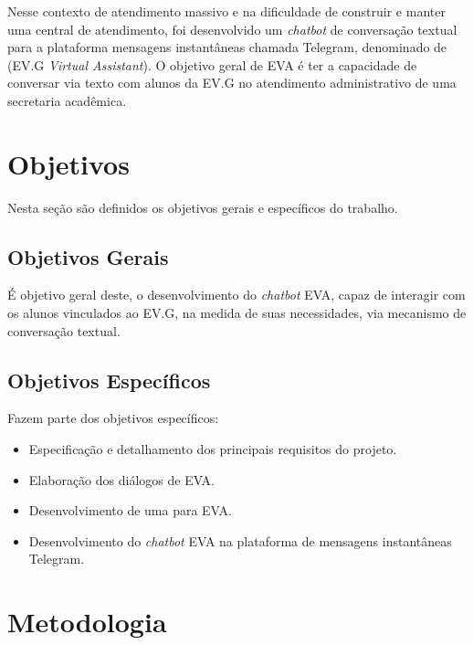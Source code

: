 Nesse contexto de atendimento massivo e na dificuldade de construir e manter uma central de atendimento, foi desenvolvido um \textit{chatbot} de conversação textual para a plataforma mensagens instantâneas chamada  Telegram, denominado de  (EV.G \textit{Virtual Assistant}).
O objetivo geral de EVA é ter a capacidade de conversar via texto com alunos da EV.G no atendimento administrativo de uma secretaria acadêmica.


\section{Objetivos}\label{cap:01:sec:01:objetivos}

Nesta seção são definidos os objetivos gerais e específicos do trabalho.


\subsection{Objetivos Gerais}\label{cap:01:sec:01:sub:01:objetivo-geral}

É objetivo geral deste, o desenvolvimento do \textit{chatbot} EVA, capaz de interagir com os alunos vinculados ao EV.G, na medida de suas necessidades, via mecanismo de conversação textual.


\subsection{Objetivos Específicos}\label{cap:01:sec:01:sub:02:ojetivos-especificos}

Fazem parte dos objetivos específicos:

\begin{itemize}
    \item Especificação e detalhamento dos principais requisitos do projeto.
    \item Elaboração dos diálogos de EVA.
    \item Desenvolvimento de uma  para EVA.
    \item Desenvolvimento do \textit{chatbot} EVA na plataforma de mensagens instantâneas Telegram.
\end{itemize}


\section{Metodologia}\label{cap:01:sec:02:metodologia}

